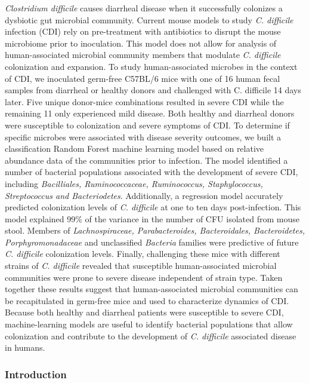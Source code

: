 \documentclass[]{article}
\begin{document}
\emph{Clostridium difficile} causes diarrheal disease when it
successfully colonizes a dysbiotic gut microbial community. Current
mouse models to study \emph{C. difficile} infection (CDI) rely on
pre-treatment with antibiotics to disrupt the mouse microbiome prior to
inoculation. This model does not allow for analysis of human-associated
microbial community members that modulate \emph{C. difficile}
colonization and expansion. To study human-associated microbes in the
context of CDI, we inoculated germ-free C57BL/6 mice with one of 16
human fecal samples from diarrheal or healthy donors and challenged with
C. difficile 14 days later. Five unique donor-mice combinations resulted
in severe CDI while the remaining 11 only experienced mild disease. Both
healthy and diarrheal donors were susceptible to colonization and severe
symptoms of CDI. To determine if specific microbes were associated with
disease severity outcomes, we built a classification Random Forest
machine learning model based on relative abundance data of the
communities prior to infection. The model identified a number of
bacterial populations associated with the development of severe CDI,
including \emph{Bacilliales, Ruminococcaceae, Ruminococcus,
Staphylococcus, Streptococcus and Bacteriodetes}. Additionally, a
regression model accurately predicted colonization levels of \emph{C.
difficile} at one to ten days post-infection. This model explained 99\%
of the variance in the number of CFU isolated from mouse stool. Members
of \emph{Lachnospiraceae, Parabacteroides, Bacteroidales, Bacteroidetes,
Porphyromonadaceae} and unclassified \emph{Bacteria} families were
predictive of future \emph{C. difficile} colonization levels. Finally,
challenging these mice with different strains of \emph{C. difficile}
revealed that susceptible human-associated microbial communities were
prone to severe disease independent of strain type. Taken together these
results suggest that human-associated microbial communities can be
recapitulated in germ-free mice and used to characterize dynamics of
CDI. Because both healthy and diarrheal patients were susceptible to
severe CDI, machine-learning models are useful to identify bacterial
populations that allow colonization and contribute to the development of
\emph{C. difficile} associated disease in humans.

\newpage

\subsubsection{Introduction}\label{introduction}
\end{document}
